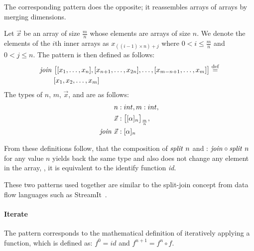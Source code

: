 \bigskip

\noindent
The corresponding \join pattern does the opposite; it reassembles arrays of arrays by merging dimensions.
\begin{definition}
  \label{definition:pattern:join}
  Let $\vec{x}$ be an array of size $\frac{m}{n}$ whose elements are arrays of size $n$.
  We denote the elements of the $i$th inner arrays as $x_{((i-1)\times n) + j}$ where $0 < i \leq \frac{m}{n}$ and $0 < j \leq n$.
  The \join pattern is then defined as follows:
  \begin{align*}
    &\text{\textit{join}}\ \big[[x_1, \ldots, x_n], [x_{n+1}, \ldots, x_{2n}], \ldots, [x_{m-n+1}, \ldots, x_m]\big] \stackrel{\textrm{\scriptsize def}}{=}\\
    &\qquad[x_1, x_2, \dots, x_m]
  \end{align*}
  The types of $n$, $m$, $\vec{x}$, and \join are as follows:
  \begin{align*}
    n &: int, m : int,\\
    \vec{x} &: \big[[\alpha]_n\big]_{\frac{m}{n}},\\
    \text{\textit{join}}\ \vec{x} &: [\alpha]_n
  \end{align*}
\end{definition}

\noindent
From these definitions follow, that the composition of $\text{\textit{split}}\ n$ and \join: $\text{\textit{join}} \circ \text{\textit{split}}\ n$ for any value $n$ yields back the same type and also does not change any element in the array, \ie, it is equivalent to the identify function \emph{id}.

These two patterns used together are similar to the split-join concept from data flow languages such as StreamIt~\cite{ThiesKaAm2002}.


\paragraph{Iterate}
The \iterateN pattern corresponds to the mathematical definition of iteratively applying a function, which is defined as: {$f^0 = id$} and {$f^{n+1} = f^n \circ f$}.

